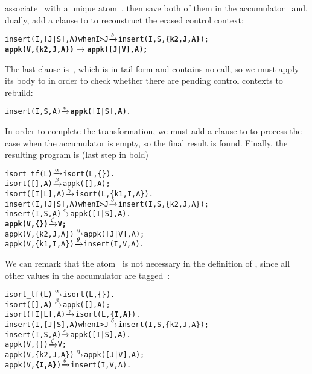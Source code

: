 associate~ with a unique atom~, then save both
of them in the accumulator~ and, dually, add a clause to
 to reconstruct the erased control context:
\begin{alltt}
insert(I,[J|S],A) when I > J \(\smashedrightarrow{\delta}\) insert(I,S,\textbf{\{k2,J,A\}});
\textbf{appk(V,\{k2,J,A\})             \(\rightarrow\) appk([J|V],A);}
\end{alltt}
The last clause is~\clause{\epsilon}, which is in tail form and
contains no call, so we must apply its body to  in
order to check whether there are pending control contexts to rebuild:
\begin{alltt}
insert(I,    S,A)            \(\smashedrightarrow{\epsilon}\) \textbf{appk(}[I|S],\textbf{A)}.
\end{alltt}
In order to complete the transformation, we must add a clause
to  to process the case when the accumulator is empty,
so the final result is found. Finally, the resulting program is (last
step in bold)\label{isort_tf_appk}
\begin{alltt}
isort_tf(L)                  \(\smashedrightarrow{\alpha}\) isort(L,\{\}).
isort(   [],A)               \(\smashedrightarrow{\beta}\) appk([],A);
isort([I|L],A)               \(\smashedrightarrow{\gamma}\) isort(L,\{k1,I,A\}).
insert(I,[J|S],A) when I > J \(\smashedrightarrow{\delta}\) insert(I,S,\{k2,J,A\});
insert(I,    S,A)            \(\smashedrightarrow{\epsilon}\) appk([I|S],A).
\textbf{appk(V,      \{\})             \(\smashedrightarrow{\zeta}\) V;}
appk(V,\{k2,J,A\})             \(\smashedrightarrow{\eta}\) appk([J|V],A);
appk(V,\{k1,I,A\})             \(\smashedrightarrow{\theta}\) insert(I,V,A).
\end{alltt}
We can remark that the atom~ is not necessary in the
definition of , since all other values in the
accumulator are tagged~:
\begin{alltt}
isort_tf(L)                  \(\smashedrightarrow{\alpha}\) isort(L,\{\}).
isort(   [],A)               \(\smashedrightarrow{\beta}\) appk([],A);
isort([I|L],A)               \(\smashedrightarrow{\gamma}\) isort(L,\textbf{\{I,A\}}).\hfill% \emph{Here}
insert(I,[J|S],A) when I > J \(\smashedrightarrow{\delta}\) insert(I,S,\{k2,J,A\});
insert(I,    S,A)            \(\smashedrightarrow{\epsilon}\) appk([I|S],A).
appk(V,      \{\})             \(\smashedrightarrow{\zeta}\) V;
appk(V,\{k2,J,A\})             \(\smashedrightarrow{\eta}\) appk([J|V],A);
appk(V,   \textbf{\{I,A\}})             \(\smashedrightarrow{\theta}\) insert(I,V,A).\hfill% \emph{and here}
\end{alltt}
